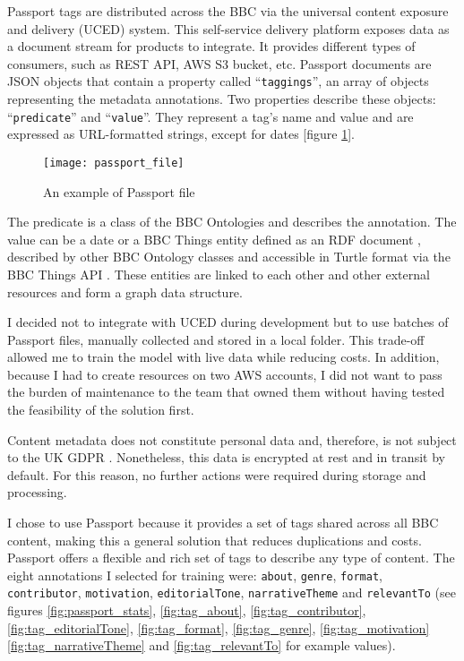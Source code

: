 Passport tags are distributed across the BBC via the universal content exposure and delivery (UCED) system.
This self-service delivery platform exposes data as a document stream for products to integrate.
It provides different types of consumers, such as REST API, AWS S3 bucket, etc.
Passport documents are JSON objects that contain a property called ``\verb|taggings|'', an array of objects representing the
metadata annotations. Two properties describe these objects: ``\verb|predicate|'' and ``\verb|value|''.
They represent a tag's name and value and are expressed as URL-formatted strings, except for dates [figure \ref{fig:passport_file}].

\begin{figure}[h]
  \centering
  \texttt{[image: passport\_file]}
  \caption{An example of Passport file}
  \label{fig:passport_file}
\end{figure}

The predicate is a class of the BBC Ontologies \cite{BBC:Ontologies} and describes the annotation.
The value can be a date or a BBC Things entity \cite{BBC:Things,BBC:Things:About} defined as an RDF document \cite{W3C:RDF,W3C:RDF:Concepts},
described by other BBC Ontology classes and accessible in Turtle format \cite{W3C:Turtle} via the BBC Things API \cite{BBC:Things:API}.
These entities are linked to each other and other external resources and form a graph data structure.


I decided not to integrate with UCED during development but to use batches of Passport files,
manually collected and stored in a local folder.
This trade-off allowed me to train the model with live data while reducing costs.
In addition, because I had to create resources on two AWS accounts,
I did not want to pass the burden of maintenance to the team that owned them without having tested the feasibility of the solution first.


Content metadata does not constitute personal data and, therefore, is not subject to the UK GDPR  \cite{UKGDPR}.
Nonetheless, this data is encrypted at rest and in transit by default.
For this reason, no further actions were required during storage and processing.


I chose to use Passport because it provides a set of tags shared across all BBC content,
making this a general solution that reduces duplications and costs.
Passport offers a flexible and rich set of tags to describe any type of content.
The eight annotations I selected for training were:
\verb|about|, \verb|genre|, \verb|format|, \verb|contributor|, \verb|motivation|,
\verb|editorialTone|, \verb|narrativeTheme| and \verb|relevantTo|
(see figures \ref{fig:passport_stats}, \ref{fig:tag_about}, \ref{fig:tag_contributor},
\ref{fig:tag_editorialTone}, \ref{fig:tag_format}, \ref{fig:tag_genre}, \ref{fig:tag_motivation}
\ref{fig:tag_narrativeTheme} and \ref{fig:tag_relevantTo} for example values).

